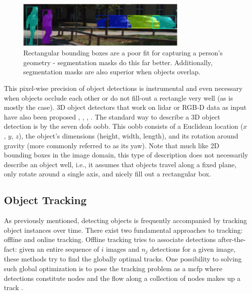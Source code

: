 \documentclass[headsepline, hidelinks, footsepline, footinclude=false, oneside, fontsize=11pt, paper=a4, listof=totoc, bibliography=totoc]{scrbook}
\begin{document}
\begin{figure}[htbp]
\centering
\includegraphics[width=0.75\textwidth]{figures/mask-vs-bbox.pdf}
\caption{\label{fig:mask-vs-bbox}Rectangular bounding boxes are a poor fit for capturing a person's geometry - segmentation masks do this far better. Additionally, segmentation masks are also superior when objects overlap.}
\end{figure}

This pixel-wise precision of object detections is instrumental and even necessary when objects occlude each other or do not fill-out a rectangle very well (as is mostly the case).
3D object detectors that work on \gls{lidar} or RGB-D data as input have also been proposed \cite{kuJoint3DProposal2018}, \cite{wengMonocular3DObject2019a}, \cite{qiFrustumPointNets3D2018}, \cite{shiPointRCNN3DObject2019a}. 
The standard way to describe a 3D object detection is by the seven \glspl{dof} \gls{oobb}. This \gls{oobb} consists of a Euclidean location (\(x\), \(y\), \(z\)), the object's dimensions (height, width, length), and its rotation around gravity (more commonly referred to as its yaw). Note that much like 2D bounding boxes in the image domain, this type of description does not necessarily describe an object well, i.e., it assumes
that objects travel along a fixed plane, only rotate around a single axis, and nicely fill out a rectangular box.


\subsection{Object Tracking \label{object-tracking}}
\label{sec:orga483366}
    As previously mentioned, detecting objects is frequently accompanied by tracking object instances over time. 
There exist two fundamental approaches to tracking: offline and online tracking.
Offline tracking tries to associate detections after-the-fact: given an entire sequence of \(i\) images and \(n_j\) detections for a given image, these methods try to find the globally optimal tracks.
One possibility to solving such global optimization is to pose the tracking problem as a \gls{mcfp} \cite{ahujaNetworkFlowsTheory1993} where detections constitute nodes and the flow along a collection of nodes makes up a track \cite{lizhangGlobalDataAssociation2008,schulterDeepNetworkFlow2017,leal-taixeEverybodyNeedsSomebody2011}.
\end{document}
